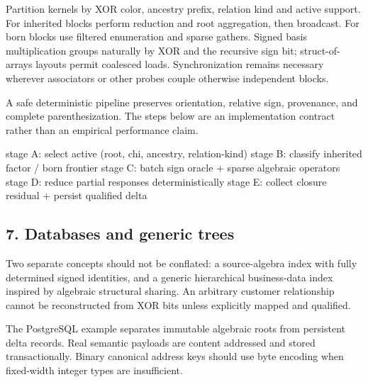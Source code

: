 \documentclass[
  10pt,
]{article}
\newenvironment{Shaded}{}{}
\newcommand{\NormalTok}[1]{#1}
\begin{document}
Partition kernels by XOR color, ancestry prefix, relation kind and
active support. For inherited blocks perform reduction and root
aggregation, then broadcast. For born blocks use filtered enumeration
and sparse gathers. Signed basis multiplication groups naturally by XOR
and the recursive sign bit; struct-of-arrays layouts permit coalesced
loads. Synchronization remains necessary wherever associators or other
probes couple otherwise independent blocks.

A safe deterministic pipeline preserves orientation, relative sign,
provenance, and complete parenthesization. The steps below are an
implementation contract rather than an empirical performance claim.

\begin{Shaded}
\begin{Highlighting}[]
\NormalTok{stage A: select active (root, chi, ancestry, relation{-}kind)}
\NormalTok{stage B: classify inherited factor / born frontier}
\NormalTok{stage C: batch sign oracle + sparse algebraic operators}
\NormalTok{stage D: reduce partial responses deterministically}
\NormalTok{stage E: collect closure residual + persist qualified delta}
\end{Highlighting}
\end{Shaded}

\subsection{7. Databases and generic
trees}\label{databases-and-generic-trees}

Two separate concepts should not be conflated: a source-algebra index
with fully determined signed identities, and a generic hierarchical
business-data index inspired by algebraic structural sharing. An
arbitrary customer relationship cannot be reconstructed from XOR bits
unless explicitly mapped and qualified.

The PostgreSQL example separates immutable algebraic roots from
persistent delta records. Real semantic payloads are content addressed
and stored transactionally. Binary canonical address keys should use
byte encoding when fixed-width integer types are insufficient.
\end{document}
